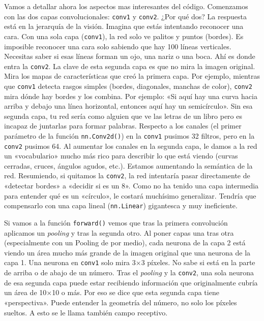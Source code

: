 \documentclass[a4paper,11pt]{article}
\begin{document}
Vamos a detallar ahora los aspectos mas interesantes del código.
Comenzamos con las dos capas convolucionales: \texttt{conv1} y
\texttt{conv2}. ¿Por qué dos? La respuesta está en la jerarquía de la
visión. Imagina que estás intentando reconocer una cara. Con una sola
capa (\texttt{conv1}), la red solo ve palitos y puntos (bordes). Es
imposible reconocer una cara solo sabiendo que hay 100 líneas
verticales. Necesitas saber si esas líneas forman un ojo, una nariz o
una boca. Ahí es donde entra la \texttt{conv2}. La clave de esta segunda
capa es que no mira la imagen original. Mira los mapas de
características que creó la primera capa. Por ejemplo, mientras que
\texttt{conv1} detecta rasgos simples (bordes, diagonales, manchas de
color), \texttt{conv2} mira dónde hay bordes y los combina. Por ejemplo:
«Si aquí hay una curva hacia arriba y debajo una línea horizontal,
entonces aquí hay un semicírculo». Sin esa segunda capa, tu red sería
como alguien que ve las letras de un libro pero es incapaz de juntarlas
para formar palabras. Respecto a los canales (el primer parámetro de la
función \texttt{nn.Conv2d()}) en la \texttt{conv1} pusimos 32 filtros,
pero en la \texttt{conv2} pusimos 64. Al aumentar los canales en la
segunda capa, le damos a la red un «vocabulario» mucho más rico para
describir lo que está viendo (curvas cerradas, cruces, ángulos agudos,
etc.). Estamos aumentando la semántica de la red. Resumiendo, si
quitamos la \texttt{conv2}, la red intentaría pasar directamente de
«detectar bordes» a «decidir si es un 8». Como no ha tenido una capa
intermedia para entender qué es un «círculo», le costará muchísimo
generalizar. Tendría que compensarlo con una capa lineal
(\texttt{nn.Linear}) gigantesca y muy ineficiente.

Si vamos a la función \texttt{forward()} vemos que tras la primera
convolución aplicamos un \emph{pooling} y tras la segunda otro. Al poner
capas una tras otra (especialmente con un Pooling de por medio), cada
neurona de la capa 2 está viendo un área mucho más grande de la imagen
original que una neurona de la capa 1. Una neurona en \texttt{conv1}
solo mira 3×3 píxeles. No sabe si está en la parte de arriba o de abajo
de un número. Tras el \emph{pooling} y la \texttt{conv2}, una sola
neurona de esa segunda capa puede estar recibiendo información que
originalmente cubría un área de 10×10 o más. Por eso se dice que esta
segunda capa tiene «perspectiva». Puede entender la geometría del
número, no solo los píxeles sueltos. A esto se le llama también campo
receptivo.
\end{document}
